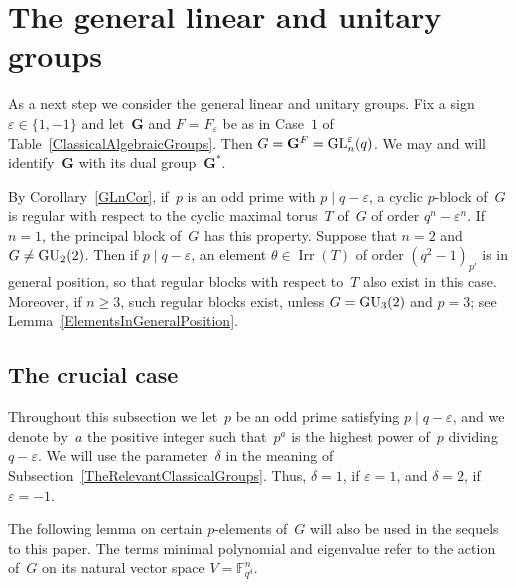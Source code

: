 \documentclass[12pt]{amsart}
\newcommand{\bG}{{\mathbf{G}}}      %
\def\GL{ \text{\rm GL} }
\def\GU{ \text{\rm GU} }
\DeclareMathOperator{\Irr}{Irr}
\theoremstyle{theorem}
\theoremstyle{definition}
\theoremstyle{remark}
\begin{document}
\section{The general linear and unitary groups}
\label{TheGeneralLinearAndUnitaryGroups}
As a next step we consider the general linear and unitary groups. Fix a sign
$\varepsilon \in \{ 1, -1 \}$ and let~$\bG$ and $F = F_{\varepsilon}$ be as in 
Case~$1$ of Table~\ref{ClassicalAlgebraicGroups}. Then $G = \bG^F = 
\GL_n^{\varepsilon}(q)$. We may and will identify~${\bG}$ with its dual
group~${\bG}^*$. 

By Corollary~\ref{GLnCor}, if~$p$ is an odd prime with 
$p \mid q - \varepsilon$, a cyclic $p$-block of~${G}$ is regular with respect 
to the cyclic maximal torus~$T$ of~${G}$ of order $q^n - \varepsilon^n$. If 
$n = 1$, the principal block of~$G$ has this property. Suppose that $n = 2$ and 
$G \neq \GU_2(2)$. Then if $p \mid q - \varepsilon$, an element 
$\theta \in \Irr(T)$ of order $(q^2-1)_{p'}$ is in general position, so that 
regular blocks with respect to~$T$ also exist in this case. Moreover, if 
$n \geq 3$, such regular blocks exist, unless $G = \GU_3(2)$ and $p = 3$; see 
Lemma~\ref{ElementsInGeneralPosition}.

\subsection{The crucial case}
\label{TheCrucialCase}
Throughout this subsection we let~$p$ be an odd prime satisfying
$p \mid q - \varepsilon$, and we denote by~$a$ the positive integer such
that~$p^a$ is the highest power of~$p$ dividing~$q - \varepsilon$.
We will use the parameter~$\delta$ in the meaning of 
Subsection~\ref{TheRelevantClassicalGroups}. Thus, $\delta = 1$, if
$\varepsilon = 1$, and $\delta = 2$, if $\varepsilon = -1$.

The following lemma on certain $p$-elements of~$G$ will also be used in the 
sequels to this paper. The terms minimal polynomial and eigenvalue refer to the 
action of~$G$ on its natural vector space $V = \mathbb{F}^n_{q^{\delta}}$.
\end{document}
